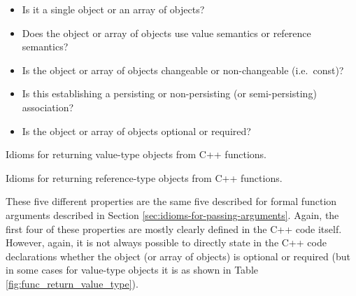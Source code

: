 \documentclass[pdf,ps2pdf,11pt]{SANDreport}
\begin{document}
\begin{itemize}

{}\item Is it a single object or an array of objects?

{}\item Does the object or array of objects use value semantics or
reference semantics?

{}\item Is the object or array of objects changeable or non-changeable
(i.e.\ const)?

{}\item Is this establishing a persisting or non-persisting (or
semi-persisting) association?

{}\item Is the object or array of objects optional or required?

\end{itemize}


\begin{table}
%
\begin{center}
%
%

%
%
%
\end{center}
\caption{\label{fig:func_return_value_type}
Idioms for returning value-type objects from C++ functions.}
%
\end{table}


\begin{table}
%
\begin{center}
%
%

%
%
%
\end{center}
\caption{\label{fig:func_return_reference_type}
Idioms for returning reference-type objects from C++ functions.}
%
\end{table}


These five different properties are the same five described for formal
function arguments described in Section
{}\ref{sec:idioms-for-passing-arguments}.  Again, the first four of
these properties are mostly clearly defined in the C++ code itself.
However, again, it is not always possible to directly state in the C++
code declarations whether the object (or array of objects) is optional
or required (but in some cases for value-type objects it is as shown
in Table {}\ref{fig:func_return_value_type}).
\end{document}
